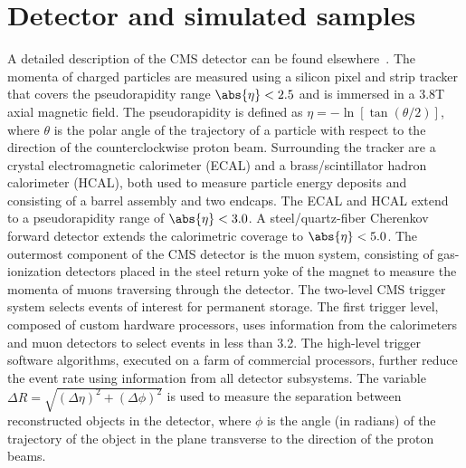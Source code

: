 \documentclass[11pt,twoside,a4paper,cmspaper,final,collab]{cms-tdr}
\begin{document}
\section{Detector and simulated samples}\label{sec:hbb_Simulations}

A detailed description of the CMS detector can be found
elsewhere~\cite{Chatrchyan:2008aa}.
The momenta of charged particles are measured using a silicon pixel
and strip tracker that covers the pseudorapidity range
$\abs{\eta} < 2.5$ and is immersed in a 3.8\unit{T}
axial magnetic field. The pseudorapidity is defined as $\eta = -\ln[\tan(\theta/2)]$, where $\theta$
is the polar angle of the trajectory of a particle with respect to
the direction of the counterclockwise proton beam.
Surrounding the tracker are a crystal electromagnetic calorimeter
(ECAL) and a brass/scintillator hadron calorimeter (HCAL), both used to
measure particle energy deposits and consisting of a barrel assembly and two endcaps. The ECAL
and HCAL extend to a pseudorapidity range of $\abs{\eta} < 3.0$. A
steel/quartz-fiber Cherenkov forward detector extends the calorimetric
coverage to $\abs{\eta} < 5.0$. The outermost component of the CMS detector is the
muon system, consisting of gas-ionization detectors placed in the
steel return yoke of the magnet
to measure the momenta of muons traversing through the detector. The two-level CMS trigger system selects events of interest for
permanent storage. The first trigger level,
composed of custom hardware processors, uses information from the
calorimeters and muon detectors to select events in less than 3.2\mus.
The high-level trigger software algorithms, executed on a farm of
commercial processors, further reduce the
event rate using information from all detector subsystems. The
variable $\Delta R = \sqrt {(\Delta\eta)^2 +(\Delta\phi)^2}$ is used to
measure the separation between reconstructed objects in the detector,
where $\phi$ is the angle (in radians) of the trajectory of the object in the
plane transverse to the direction of the proton beams.
\end{document}

